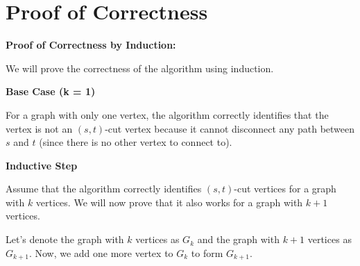 \documentclass{article}
\begin{document}
\section{Proof of Correctness}
    
    \textbf{Proof of Correctness by Induction:}
    
    We will prove the correctness of the algorithm using induction.
        
        \textbf{Base Case (k = 1)}
        
            For a graph with only one vertex, the algorithm correctly identifies that the vertex is not an $(s, t)$-cut vertex because it cannot disconnect any path between $s$ and $t$ (since there is no other vertex to connect to).
        
        \textbf{Inductive Step}
        
            Assume that the algorithm correctly identifies $(s, t)$-cut vertices for a graph with $k$ vertices. We will now prove that it also works for a graph with $k + 1$ vertices.
            
            Let's denote the graph with $k$ vertices as $G_k$ and the graph with $k + 1$ vertices as $G_{k+1}$. Now, we add one more vertex to $G_k$ to form $G_{k+1}$.
            
\end{document}
